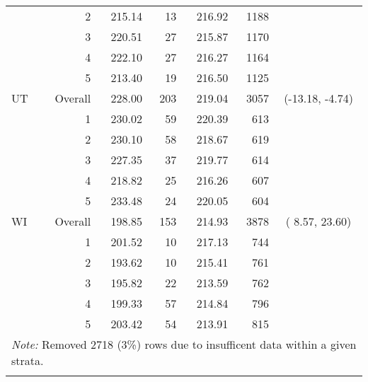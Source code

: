\begin{longtable}{lrrr@{\extracolsep{.25cm}}rrc}
   & 2 & 215.14 &  13 & 216.92 & 1188 &  \\ 
   & 3 & 220.51 &  27 & 215.87 & 1170 &  \\ 
   & 4 & 222.10 &  27 & 216.27 & 1164 &  \\ 
   & 5 & 213.40 &  19 & 216.50 & 1125 &  \\ 
   \hline
UT & Overall & 228.00 & 203 & 219.04 & 3057 & (-13.18,  -4.74) \\ 
   & 1 & 230.02 &  59 & 220.39 & 613 &  \\ 
   & 2 & 230.10 &  58 & 218.67 & 619 &  \\ 
   & 3 & 227.35 &  37 & 219.77 & 614 &  \\ 
   & 4 & 218.82 &  25 & 216.26 & 607 &  \\ 
   & 5 & 233.48 &  24 & 220.05 & 604 &  \\ 
   \hline
WI & Overall & 198.85 & 153 & 214.93 & 3878 & (  8.57,  23.60) \\ 
   & 1 & 201.52 &  10 & 217.13 & 744 &  \\ 
   & 2 & 193.62 &  10 & 215.41 & 761 &  \\ 
   & 3 & 195.82 &  22 & 213.59 & 762 &  \\ 
   & 4 & 199.33 &  57 & 214.84 & 796 &  \\ 
   & 5 & 203.42 &  54 & 213.91 & 815 &  \\ 
   \hline \multicolumn{7}{l}{\textit{Note:} Removed 2718 (3\%) rows due to insufficent data within a given strata.} \\\hline
\label{g4read-mlpsa-lr}
\end{longtable}
